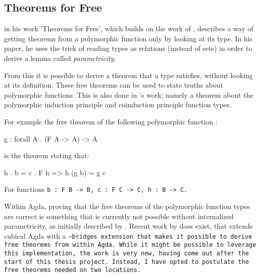 
\subsection{Theorems for Free}\label{sec:free}
\cite{Wadler1989} in his work 'Theorems for Free', which builds on the work of \cite{Reynolds1983}, describes a way of getting theorems from a polymorphic function only by looking at its type.
In his paper, he uses the trick of reading types as relations (instead of sets) in order to derive a lemma called \textit{parametricity}.

From this it is possible to derive a theorem that a type satisfies, without looking at its definition.
These free theorems can be used to state truths about polymorphic functions.
This is also done in \cite{Harper2011}'s work; namely a theorem about the polymorphic induction principle and coinduction principle function types.

For example the free theorem of the following polymorphic function \citep{Harper2011}:
\begin{code}
g : forall A . (F A -> A) -> A
\end{code}
is the theorem stating that:
\begin{code}
h . b = c . F h => h (g b) = g c
\end{code}
For functions \tt{b : F B -> B}, \tt{c : F C -> C}, \tt{h : B -> C}.


Within Agda, proving that the free theorems of the polymorphic function types are correct is something that is currently not possible without internalized parametricity, as initially described by \cite{Bernardy2012}.
Recent work by \cite{Muylder2024} does exist, that extends cubical Agda with a \tt{--bridges} extension that makes it possible to derive free theorems from within Agda.
While it might be possible to leverage this implementation, the work is very new, having come out after the start of this thesis project.
Instead, I have opted to postulate the free theorems needed on two locations.